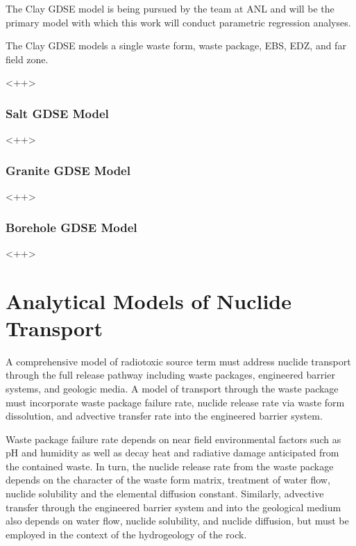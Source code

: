 The Clay \gls{GDSE} model is being pursued by the team at \gls{ANL} and will be 
the primary model with which this work will conduct parametric regression 
analyses. 

The Clay \gls{GDSE} models a single waste form, waste package, \gls{EBS}, 
\gls{EDZ}, and far field zone.

<++>

\subsubsection{Salt GDSE Model}

<++>


\subsubsection{Granite GDSE Model}

<++>

\subsubsection{ Borehole GDSE Model}


<++>


\section{Analytical Models of Nuclide Transport} \label{sec:analytical_nuc}






A comprehensive model of radiotoxic source term must address nuclide transport
through the full release pathway including waste packages, engineered barrier
systems, and geologic media. A model of transport through the waste package
must incorporate waste package failure rate, nuclide release rate via waste
form dissolution, and advective transfer rate into the engineered barrier
system.  

Waste package failure rate depends on near field environmental factors such as
pH and humidity as well as decay heat and radiative damage anticipated from the
contained waste.  In turn, the nuclide release rate from the waste package
depends on the character of the waste form matrix, treatment of water flow,
nuclide solubility and the elemental diffusion constant.  Similarly, advective
transfer through the engineered barrier system and into the geological medium
also depends on water flow, nuclide solubility, and nuclide diffusion, but must
be employed in the context of the hydrogeology of the rock.   

